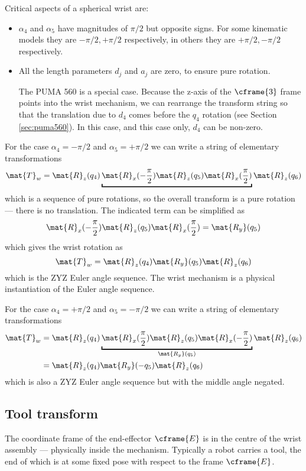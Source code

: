 \documentclass[11pt]{article}
\numberwithin{equation}{section}
\begin{document}
Critical aspects of a spherical wrist are:
\begin{itemize}
\item $\alpha_4$ and $\alpha_5$ have magnitudes of $\pi/2$ but opposite signs.  For some kinematic models they are $-\pi/2, +\pi/2$ respectively, 
in others they are $+\pi/2, -\pi/2$ respectively.
\item All the length parameters $d_j$ and $a_j$ are zero, to ensure pure rotation.

The PUMA 560 is a special case.  Because the z-axis of the $\cframe{3}$ frame points into the wrist mechanism, we can rearrange the
transform string so that the translation due to $d_4$ comes before the $q_4$ rotation (see Section \ref{sec:puma560}).  In this case, and this case only, $d_4$ can be
non-zero.
\end{itemize}

For the case  $\alpha_4=-\pi/2$ and $\alpha_5=+\pi/2$ we can write a string of elementary transformations
\[
\mat{T}_w = \mat{R}_z(q_4) \underbracket{\mat{R}_x(-\frac{\pi}{2})  \mat{R}_z(q_5)  \mat{R}_x(\frac{\pi}{2})}  \mat{R}_z(q_6)
\]
which is a sequence of pure rotations, so the overall transform is a pure rotation --- there is no translation.
The indicated term  can be simplified as
\[
\mat{R}_x(-\frac{\pi}{2})  \mat{R}_z(q_5)  \mat{R}_x(\frac{\pi}{2}) = \mat{R_y}(q_5)
\]
which gives the wrist rotation as
\[
\mat{T}_w = \mat{R}_z(q_4) \mat{R_y}(q_5)  \mat{R}_z(q_6)
\]
which is the ZYZ Euler angle sequence.  The wrist mechanism is a physical instantiation of the Euler angle sequence.

For the case  $\alpha_4=+\pi/2$ and $\alpha_5=-\pi/2$ we can write a string of elementary transformations
\begin{align}
\mat{T}_w &= \mat{R}_z(q_4) \underbracket{\mat{R}_x(\frac{\pi}{2})  \mat{R}_z(q_5)  \mat{R}_x(-\frac{\pi}{2})}_{\mat{R_y}(q_5)}  \mat{R}_z(q_6) \\
&= \mat{R}_z(q_4) \mat{R_y}(-q_5)  \mat{R}_z(q_6)
\end{align}
which is also a ZYZ Euler angle sequence but with the middle angle negated.

\subsection{Tool transform}
The coordinate frame of the end-effector $\cframe{E}$  is in the centre of the wrist assembly --- physically inside the mechanism.  Typically a robot carries a tool, the end of which
is at some fixed pose with respect to the  frame $\cframe{E}$.  
\end{document}
